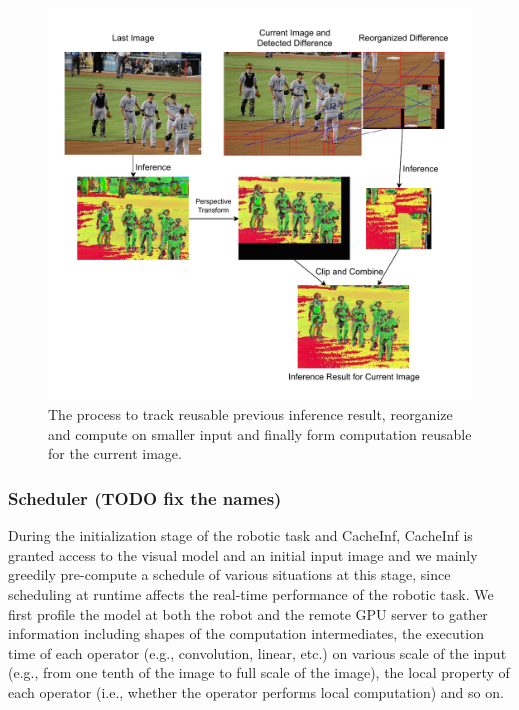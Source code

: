 \begin{figure}
    \centering
    \includegraphics[width=\linewidth]{fig/overview_track.drawio.pdf}
    \caption[track]{The process to track reusable previous inference result, reorganize and compute on smaller input and finally form computation reusable for the current image.}
    \label{fig:track}
\end{figure}

\subsubsection*{Scheduler (TODO fix the names)}
During the initialization stage of the robotic task and CacheInf, CacheInf is granted access to the visual model and an initial input image and we mainly greedily pre-compute a schedule of various situations at this stage, since scheduling at runtime affects the real-time performance of the robotic task.
We first profile the model at both the robot and the remote GPU server to gather information  including shapes of the computation intermediates, the execution time of each operator (e.g., convolution, linear, etc.) on various scale of the input (e.g., from one tenth of the image to full scale of the image), the local property of each operator (i.e., whether the operator performs local computation) and so on.

